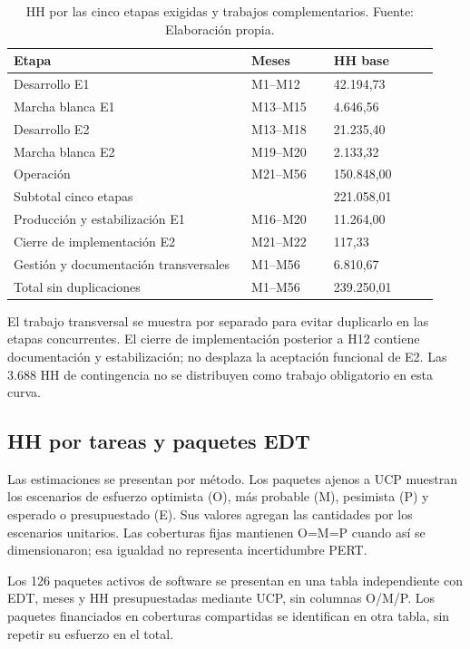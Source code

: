 \documentclass[11pt]{article}
\begin{document}
\begingroup
\small
\begin{longtable}{@{}p{0.52\linewidth}p{0.18\linewidth}p{0.23\linewidth}@{}}
\caption[HH por las cinco etapas exigidas y trabajos complementarios]{HH por las cinco etapas exigidas y trabajos complementarios. Fuente: Elaboración propia.}\label{tab:t15-5}\\
\toprule
\textbf{Etapa} & \textbf{Meses} & \textbf{HH base} \\
\midrule
\endhead
\bottomrule
\endlastfoot
Desarrollo E1 & M1–M12 & 42.194,73 \\
Marcha blanca E1 & M13–M15 & 4.646,56 \\
Desarrollo E2 & M13–M18 & 21.235,40 \\
Marcha blanca E2 & M19–M20 & 2.133,32 \\
Operación & M21–M56 & 150.848,00 \\
Subtotal cinco etapas &  & 221.058,01 \\
Producción y estabilización E1 & M16–M20 & 11.264,00 \\
Cierre de implementación E2 & M21–M22 & 117,33 \\
Gestión y documentación transversales & M1–M56 & 6.810,67 \\
Total sin duplicaciones & M1--M56 & 239.250,01 \\
\end{longtable}
\endgroup



El trabajo transversal se muestra por separado para evitar duplicarlo en las etapas concurrentes. El cierre de implementación posterior a H12 contiene documentación y estabilización; no desplaza la aceptación funcional de E2. Las 3.688 HH de contingencia no se distribuyen como trabajo obligatorio en esta curva.

\subsection{HH por tareas y paquetes EDT}

Las estimaciones se presentan por método. Los paquetes ajenos a UCP muestran los escenarios de esfuerzo optimista (O), más probable (M), pesimista (P) y esperado o presupuestado (E). Sus valores agregan las cantidades por los escenarios unitarios. Las coberturas fijas mantienen O=M=P cuando así se dimensionaron; esa igualdad no representa incertidumbre PERT.

Los 126 paquetes activos de software se presentan en una tabla independiente con EDT, meses y HH presupuestadas mediante UCP, sin columnas O/M/P. Los paquetes financiados en coberturas compartidas se identifican en otra tabla, sin repetir su esfuerzo en el total.
\end{document}
